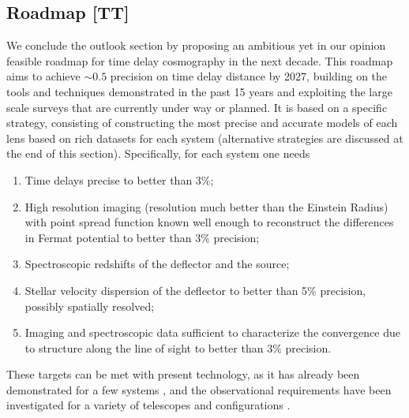 \subsection{Roadmap [TT]}
\label{ssec:roadmap}

We conclude the outlook section by proposing an ambitious yet in our
opinion feasible roadmap for time delay cosmography in the next
decade. This roadmap aims to achieve $\sim0.5$ precision on time delay
distance by 2027, building on the tools and techniques demonstrated in
the past 15 years and exploiting the large scale surveys that are
currently under way or planned. It is based on a specific strategy,
consisting of constructing the most precise and accurate models of
each lens based on rich datasets for each system (alternative
strategies are discussed at the end of this section). Specifically,
for each system one needs

\begin{enumerate}
\item Time delays precise to better than $3\%$;
\item High resolution imaging (resolution much better than the Einstein Radius) with point spread function known well enough to reconstruct the differences in Fermat potential to better than $3\%$ precision;
\item Spectroscopic redshifts of the deflector and the source;
\item Stellar velocity dispersion of the deflector to better than 5\% precision, possibly spatially resolved;
\item Imaging and spectroscopic data sufficient to characterize the convergence due to structure along the line of sight to better than $3\%$ precision.
\end{enumerate}

These targets can be met with present technology, as it has already
been demonstrated for a few systems \citep{Tew++13,Suy++13}, and the
observational requirements have been investigated for a variety of
telescopes and configurations
\citep{Gre++13,Collett:2013p34320,Men++15,Lin15}.


